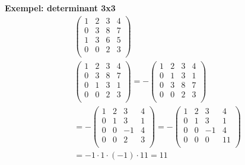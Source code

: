 \begin{multicols}{2}
\textbf{Exempel: determinant 3x3 }
\begin{align*}
  &\left(\begin{array}{cccc}
    1 & 2 & 3 & 4  \\
    0 & 3 & 8 & 7  \\
    1 & 3 & 6 & 5  \\
    0 & 0 & 2 & 3  \\
  \end{array}\right) \\
  &\left(\begin{array}{cccc}
    1 & 2 & 3 & 4  \\
    0 & 3 & 8 & 7  \\
    0 & 1 & 3 & 1  \\
    0 & 0 & 2 & 3  \\
  \end{array}\right) =
  -\left(\begin{array}{cccc}
    1 & 2 & 3 & 4  \\
    0 & 1 & 3 & 1  \\
    0 & 3 & 8 & 7  \\
    0 & 0 & 2 & 3  \\
  \end{array}\right) \\
  &=-\left(\begin{array}{cccc}
    1 & 2 & 3  & 4  \\
    0 & 1 & 3  & 1  \\
    0 & 0 & -1 & 4  \\
    0 & 0 & 2  & 3  \\
  \end{array}\right)
  =-\left(\begin{array}{cccc}
    1 & 2 & 3  & 4   \\
    0 & 1 & 3  & 1   \\
    0 & 0 & -1 & 4   \\
    0 & 0 & 0  & 11  \\
  \end{array}\right) \\
  &= -1\cdot{1}\cdot{(-1)}\cdot{11} = 11 \\
\end{align*}



\end{multicols}
